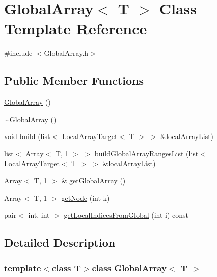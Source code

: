 \hypertarget{class_global_array}{\section{\-Global\-Array$<$ \-T $>$ \-Class \-Template \-Reference}
\label{class_global_array}
}


{\ttfamily \#include $<$\-Global\-Array.\-h$>$}

\subsection*{\-Public \-Member \-Functions}
\begin{DoxyCompactItemize}
\item 
\hyperlink{class_global_array_a96570937786aa847350cadcf2a2deb6e}{\-Global\-Array} ()
\item 
\hyperlink{class_global_array_a41c47e855bdaa6ebd2b00541f1b9e5fe}{$\sim$\-Global\-Array} ()
\item 
void \hyperlink{class_global_array_a785072abe434f74ea777044b5d16d4bd}{build} (list$<$ \hyperlink{class_local_array_target}{\-Local\-Array\-Target}$<$ \-T $>$ $>$ \&local\-Array\-List)
\item 
list$<$ \-Array$<$ \-T, 1 $>$ $>$ \hyperlink{class_global_array_ac81fd0b504d70fc51ab9df89707b523a}{build\-Global\-Array\-Ranges\-List} (list$<$ \hyperlink{class_local_array_target}{\-Local\-Array\-Target}$<$ \-T $>$ $>$ \&local\-Array\-List)
\item 
\-Array$<$ \-T, 1 $>$ \& \hyperlink{class_global_array_a78ce4aa9d6bbd062f92dc233c368b1a7}{get\-Global\-Array} ()
\item 
\-Array$<$ \-T, 1 $>$ \hyperlink{class_global_array_a63db21859b40c12c5c9e4221d3db66b5}{get\-Node} (int k)
\item 
pair$<$ int, int $>$ \hyperlink{class_global_array_ad8f1ca4e0051ed951708caeb9adb4463}{get\-Local\-Indices\-From\-Global} (int i) const 
\end{DoxyCompactItemize}


\subsection{\-Detailed \-Description}
\subsubsection*{template$<$class \-T$>$class Global\-Array$<$ T $>$}

